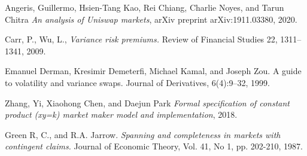 \documentclass[12pt]{article}
\begin{document}





\begin{thebibliography}{}
 Angeris, Guillermo, Hsien-Tang Kao, Rei Chiang, Charlie Noyes, and Tarun Chitra  \textit{An analysis of Uniswap markets}, arXiv preprint arXiv:1911.03380, 2020.


 Carr, P., Wu, L., \textit{Variance risk premiums.} Review of Financial Studies 22, 1311–1341, 2009.

 Emanuel Derman, Kresimir Demeterfi, Michael Kamal, and Joseph Zou. A guide to volatility
and variance swaps. Journal of Derivatives, 6(4):9–32, 1999.

 Zhang, Yi, Xiaohong Chen, and Daejun Park \textit{Formal specification of constant product (xy=k) market maker model and implementation}, 2018.


 Green R, C., and R.A. Jarrow. \textit{Spanning and completeness in markets with contingent claims.}
Journal of Economic Theory, Vol. 41, No 1, pp. 202-210, 1987.






\end{thebibliography}
\end{document}

